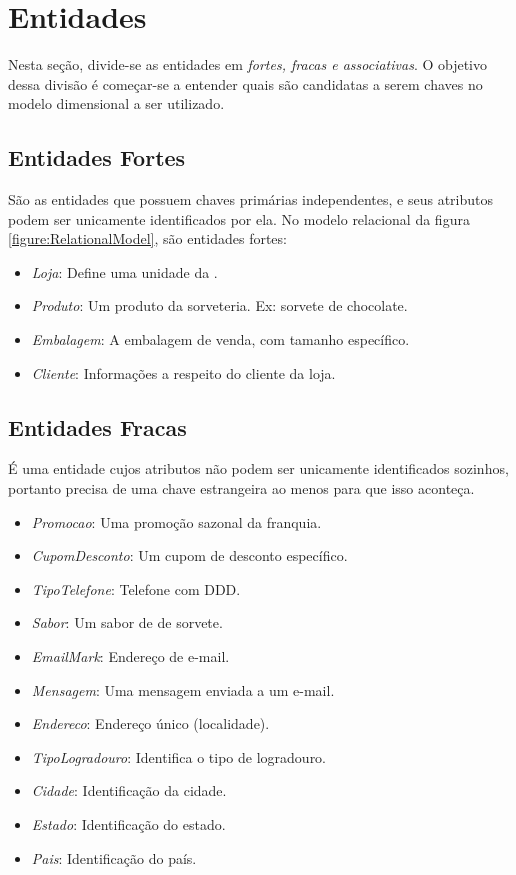 \section {Entidades}

Nesta seção, divide-se as entidades em \emph{fortes, fracas e associativas}. O objetivo dessa divisão é começar-se a entender quais são candidatas a serem chaves no modelo dimensional a ser utilizado.

\subsection{Entidades Fortes}
São as entidades que possuem chaves primárias independentes, e seus atributos podem ser unicamente identificados por ela. No modelo relacional da figura \ref{figure:RelationalModel}, são entidades fortes:

\begin{itemize}
\item \emph{Loja}: Define uma unidade da \storeFullName{}.
\item \emph{Produto}: Um produto da sorveteria. Ex: sorvete de chocolate.
\item \emph{Embalagem}: A embalagem de venda, com tamanho específico.
\item \emph{Cliente}: Informações a respeito do cliente da loja.
\end{itemize}

\subsection{Entidades Fracas}

É uma entidade cujos atributos não podem ser unicamente identificados sozinhos, portanto precisa de uma chave estrangeira ao menos para que isso aconteça. 

\begin{itemize}
\item \emph{Promocao}: Uma promoção sazonal da franquia.
\item \emph{CupomDesconto}: Um cupom de desconto específico.
\item \emph{TipoTelefone}: Telefone com DDD.
\item \emph{Sabor}: Um sabor de de sorvete.
\item \emph{EmailMark}: Endereço de e-mail.
\item \emph{Mensagem}: Uma mensagem enviada a um e-mail.
\item \emph{Endereco}: Endereço único (localidade).
\item \emph{TipoLogradouro}: Identifica o tipo de logradouro.
\item \emph{Cidade}: Identificação da cidade.
\item \emph{Estado}: Identificação do estado.
\item \emph{Pais}: Identificação do país.
\end{itemize}


